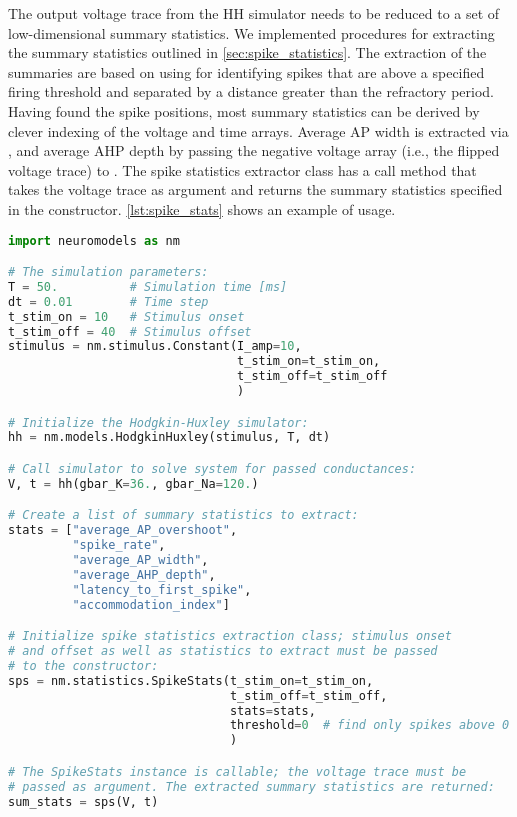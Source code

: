 The output voltage trace from the HH simulator needs to be reduced to a set of low-dimensional summary statistics. We implemented procedures for extracting the summary statistics outlined in \cref{sec:spike_statistics}. The extraction of the summaries are based on using  for identifying spikes that are above a specified firing threshold and separated by a distance greater than the refractory period. Having found the spike positions, most summary statistics can be derived by clever indexing of the voltage and time arrays. Average AP width is extracted via , and average AHP depth by passing the negative voltage array (i.e., the flipped voltage trace) to . The spike statistics extractor class has a call method that takes the voltage trace as argument and returns the summary statistics specified in the constructor. \cref{lst:spike_stats} shows an example of usage.
\begin{lstlisting}[language=python, label={lst:spike_stats}, caption={Example usage of spike statistics extraction class.}]
import neuromodels as nm

# The simulation parameters:
T = 50.          # Simulation time [ms]
dt = 0.01        # Time step
t_stim_on = 10   # Stimulus onset
t_stim_off = 40  # Stimulus offset
stimulus = nm.stimulus.Constant(I_amp=10,
                                t_stim_on=t_stim_on,
                                t_stim_off=t_stim_off
                                )

# Initialize the Hodgkin-Huxley simulator:
hh = nm.models.HodgkinHuxley(stimulus, T, dt)

# Call simulator to solve system for passed conductances:
V, t = hh(gbar_K=36., gbar_Na=120.)

# Create a list of summary statistics to extract:
stats = ["average_AP_overshoot",
         "spike_rate",
         "average_AP_width",
         "average_AHP_depth",
         "latency_to_first_spike",
         "accommodation_index"]

# Initialize spike statistics extraction class; stimulus onset
# and offset as well as statistics to extract must be passed
# to the constructor:
sps = nm.statistics.SpikeStats(t_stim_on=t_stim_on,
                               t_stim_off=t_stim_off,
                               stats=stats,
                               threshold=0  # find only spikes above 0 mV
                               )

# The SpikeStats instance is callable; the voltage trace must be
# passed as argument. The extracted summary statistics are returned:
sum_stats = sps(V, t)
\end{lstlisting}

